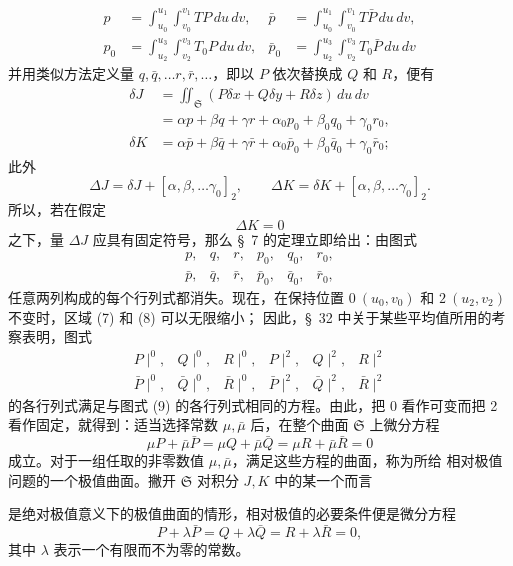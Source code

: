 \documentclass[11pt,a4paper,leqno]{article}
\begin{document}
\[
\begin{aligned}
p&=\int_{u_0}^{u_1}\!\int_{v_0}^{v_1}TP\,du\,dv,
&\bar p&=\int_{u_0}^{u_1}\!\int_{v_0}^{v_1}T\bar P\,du\,dv,\\
p_0&=\int_{u_2}^{u_3}\!\int_{v_2}^{v_3}T_0P\,du\,dv,
&\bar p_0&=\int_{u_2}^{u_3}\!\int_{v_2}^{v_3}T_0\bar P\,du\,dv
\end{aligned}
\]
并用类似方法定义量 $q,\bar q,\ldots r,\bar r,\ldots$，即以
$P$ 依次替换成 $Q$ 和 $R$，便有
\[
\begin{aligned}
\delta J
&=\iint_{\mathfrak{S}}(P\delta x+Q\delta y+R\delta z)\,du\,dv\\
&=\alpha p+\beta q+\gamma r+\alpha_0p_0+\beta_0q_0+\gamma_0r_0,\\
\delta K
&=\alpha\bar p+\beta\bar q+\gamma\bar r
+\alpha_0\bar p_0+\beta_0\bar q_0+\gamma_0\bar r_0;
\end{aligned}
\]
此外
\[
\Delta J=\delta J+[\alpha,\beta,\ldots\gamma_0]_2,
\qquad
\Delta K=\delta K+[\alpha,\beta,\ldots\gamma_0]_2.
\]
所以，若在假定
\[
\Delta K=0
\]
之下，量 $\Delta J$ 应具有固定符号，那么 \S~7 的定理立即给出：由图式
\begin{equation}\tag{9}
\begin{array}{cccccc}
p,&q,&r,&p_0,&q_0,&r_0,\\
\bar p,&\bar q,&\bar r,&\bar p_0,&\bar q_0,&\bar r_0,
\end{array}
\end{equation}
任意两列构成的每个行列式都消失。现在，在保持位置
$0\ (u_0,v_0)$ 和 $2\ (u_2,v_2)$ 不变时，区域 (7) 和 (8) 可以无限缩小；
因此，\S~32 中关于某些平均值所用的考察表明，图式
\[
\begin{array}{cccccc}
P\!\mid^0,&Q\!\mid^0,&R\!\mid^0,&P\!\mid^2,&Q\!\mid^2,&R\!\mid^2\\
\bar P\!\mid^0,&\bar Q\!\mid^0,&\bar R\!\mid^0,
&\bar P\!\mid^2,&\bar Q\!\mid^2,&\bar R\!\mid^2
\end{array}
\]
的各行列式满足与图式 (9) 的各行列式相同的方程。由此，把 0 看作可变而把 2
看作固定，就得到：适当选择常数 $\mu,\bar\mu$ 后，在整个曲面
$\mathfrak{S}$ 上微分方程
\[
\mu P+\bar\mu\bar P
=\mu Q+\bar\mu\bar Q
=\mu R+\bar\mu\bar R=0
\]
成立。对于一组任取的非零数值 $\mu,\bar\mu$，满足这些方程的曲面，称为所给
相对极值问题的一个极值曲面。撇开 $\mathfrak{S}$ 对积分 $J,K$ 中的某一个而言

是绝对极值意义下的极值曲面的情形，相对极值的必要条件便是微分方程
\[
P+\lambda\bar P=Q+\lambda\bar Q=R+\lambda\bar R=0,
\]
其中 $\lambda$ 表示一个有限而不为零的常数。
\end{document}
